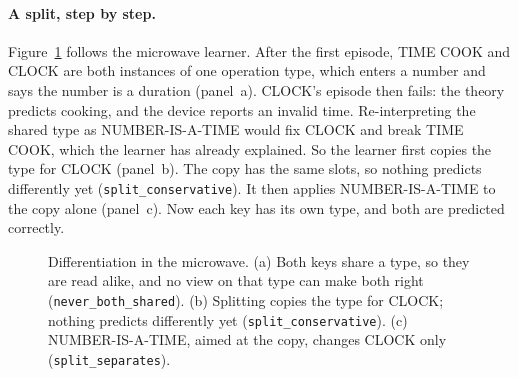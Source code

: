 \documentclass[11pt]{article}
\newcommand{\lean}[1]{\texttt{#1}}
\begin{document}
\paragraph{A split, step by step.} Figure~\ref{fig:split} follows the microwave learner. After the first episode, TIME COOK and CLOCK are both instances of one operation type, which enters a number and says the number is a duration (panel~a). CLOCK's episode then fails: the theory predicts cooking, and the device reports an invalid time. Re-interpreting the shared type as NUMBER-IS-A-TIME would fix CLOCK and break TIME COOK, which the learner has already explained. So the learner first copies the type for CLOCK (panel~b). The copy has the same slots, so nothing predicts differently yet (\lean{split\_conservative}). It then applies NUMBER-IS-A-TIME to the copy alone (panel~c). Now each key has its own type, and both are predicted correctly.

\begin{figure}[t]
\centering
{}
\caption{Differentiation in the microwave. (a) Both keys share a type, so they are read alike, and no view on that type can make both right (\lean{never\_both\_shared}). (b) Splitting copies the type for CLOCK; nothing predicts differently yet (\lean{split\_conservative}). (c) NUMBER-IS-A-TIME, aimed at the copy, changes CLOCK only (\lean{split\_separates}).}
\label{fig:split}
\end{figure}
\end{document}
